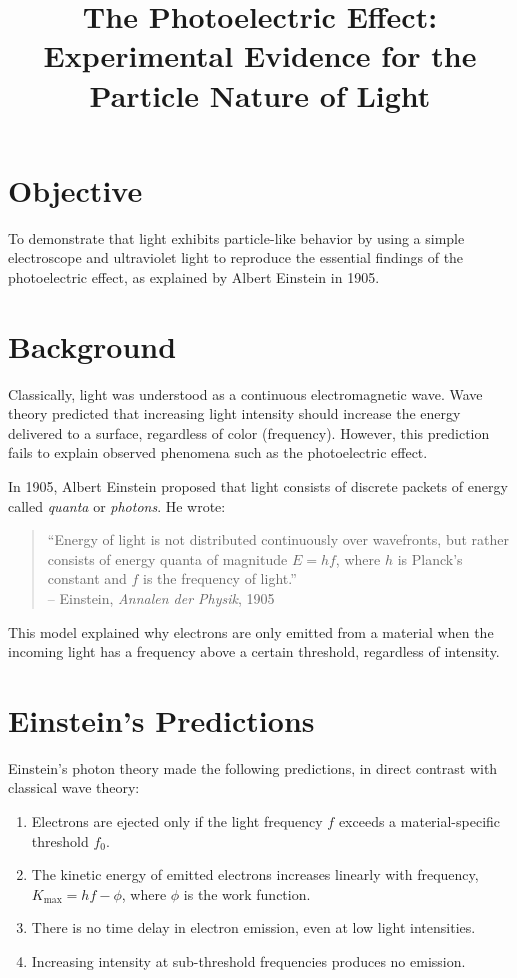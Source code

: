\documentclass[12pt]{article}
\title{\bfseries The Photoelectric Effect: Experimental Evidence for the Particle Nature of Light}
\author{}
\date{}
\begin{document}
\maketitle

\section*{Objective}
To demonstrate that light exhibits particle-like behavior by using a simple electroscope and ultraviolet light to reproduce the essential findings of the photoelectric effect, as explained by Albert Einstein in 1905.

\section*{Background}
Classically, light was understood as a continuous electromagnetic wave. Wave theory predicted that increasing light intensity should increase the energy delivered to a surface, regardless of color (frequency). However, this prediction fails to explain observed phenomena such as the photoelectric effect.

In 1905, Albert Einstein proposed that light consists of discrete packets of energy called \emph{quanta} or \emph{photons}. He wrote:

\begin{quote}
    ``Energy of light is not distributed continuously over wavefronts, but rather consists of energy quanta of magnitude $E = hf$, where $h$ is Planck's constant and $f$ is the frequency of light.'' \\
    \hfill -- Einstein, \emph{Annalen der Physik}, 1905
\end{quote}

This model explained why electrons are only emitted from a material when the incoming light has a frequency above a certain threshold, regardless of intensity.

\section*{Einstein's Predictions}
Einstein's photon theory made the following predictions, in direct contrast with classical wave theory:

\begin{enumerate}[label=(\alph*)]
    \item Electrons are ejected only if the light frequency $f$ exceeds a material-specific threshold $f_0$.
    \item The kinetic energy of emitted electrons increases linearly with frequency, $K_{\text{max}} = hf - \phi$, where $\phi$ is the work function.
    \item There is no time delay in electron emission, even at low light intensities.
    \item Increasing intensity at sub-threshold frequencies produces no emission.
\end{enumerate}
\end{document}
